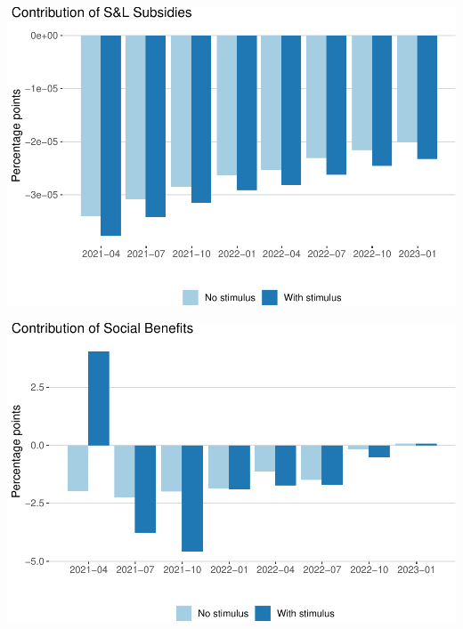 \documentclass[
]{article}
\begin{document}
\begin{center}\includegraphics{stimulus-changes_files/figure-latex/subsidies_state-1} \end{center}

\begin{center}\includegraphics{stimulus-changes_files/figure-latex/social-benefits-1} \end{center}
\end{document}
